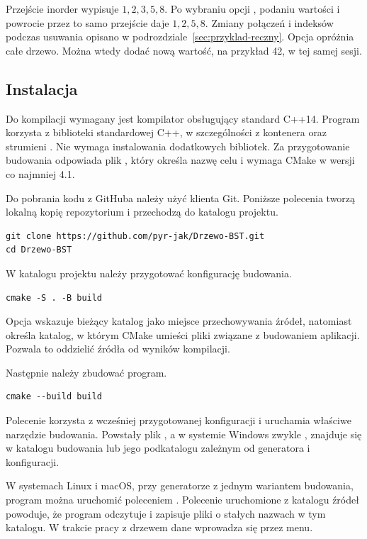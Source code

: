 Przejście inorder wypisuje $1,2,3,5,8$. Po wybraniu opcji ,
podaniu wartości  i powrocie przez  to samo przejście
daje $1,2,5,8$. Zmiany połączeń i indeksów podczas usuwania opisano
w podrozdziale~\ref{sec:przyklad-reczny}. Opcja  opróżnia całe
drzewo. Można wtedy dodać nową wartość, na przykład 42, w tej samej sesji.

\subsection{Instalacja}

Do kompilacji wymagany jest kompilator obsługujący standard C++14.
Program korzysta z biblioteki standardowej C++, w szczególności
z kontenera  oraz strumieni .
Nie wymaga instalowania dodatkowych bibliotek.
Za przygotowanie budowania odpowiada plik ,
który określa nazwę celu 
i wymaga CMake w wersji co najmniej 4.1.

Do pobrania kodu z GitHuba należy użyć klienta Git.
Poniższe polecenia tworzą lokalną kopię repozytorium
i przechodzą do katalogu projektu.
\begin{lstlisting}[style=terminal]
git clone https://github.com/pyr-jak/Drzewo-BST.git
cd Drzewo-BST
\end{lstlisting}

W katalogu projektu należy przygotować konfigurację budowania.
\begin{lstlisting}[style=terminal]
cmake -S . -B build
\end{lstlisting}
Opcja  wskazuje bieżący katalog jako miejsce
przechowywania źródeł, natomiast  określa katalog,
w którym CMake umieści pliki związane z budowaniem aplikacji.
Pozwala to oddzielić źródła od wyników kompilacji.

Następnie należy zbudować program.
\begin{lstlisting}[style=terminal]
cmake --build build
\end{lstlisting}
Polecenie korzysta z wcześniej przygotowanej konfiguracji
i uruchamia właściwe narzędzie budowania.
Powstały plik , a w systemie Windows zwykle
, znajduje się w katalogu budowania
lub jego podkatalogu zależnym od generatora i konfiguracji.

W systemach Linux i macOS, przy generatorze z jednym wariantem
budowania, program można uruchomić poleceniem .
Polecenie uruchomione z katalogu źródeł powoduje, że program odczytuje
i zapisuje pliki o stałych nazwach w tym katalogu. W trakcie pracy
z drzewem dane wprowadza się przez menu.

